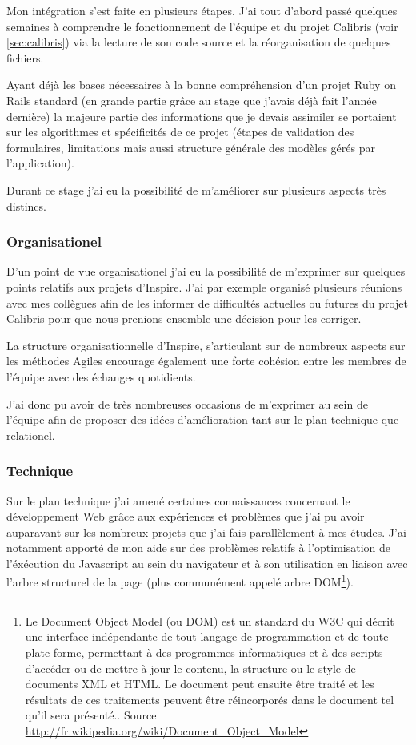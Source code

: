 \documentclass[12pt,a4paper]{book}
\begin{document}
Mon intégration s'est faite en plusieurs étapes. J'ai tout d'abord passé quelques semaines à comprendre le fonctionnement de l'équipe et du projet Calibris (voir \cref{sec:calibris}) via la lecture de son code source et la réorganisation de quelques fichiers.

Ayant déjà les bases nécessaires à la bonne compréhension d'un projet Ruby on Rails standard (en grande partie grâce au stage que j'avais déjà fait l'année dernière) la majeure partie des informations que je devais assimiler se portaient sur les algorithmes et spécificités de ce projet (étapes de validation des formulaires, limitations mais aussi structure générale des modèles gérés par l'application).

Durant ce stage j'ai eu la possibilité de m'améliorer sur plusieurs aspects très distincs.

\subsubsection{Organisationel}

D'un point de vue organisationel j'ai eu la possibilité de m'exprimer sur quelques points relatifs aux projets d'Inspire. J'ai par exemple organisé plusieurs réunions avec mes collègues afin de les informer de difficultés actuelles ou futures du projet Calibris pour que nous prenions ensemble une décision pour les corriger.

La structure organisationnelle d'Inspire, s'articulant sur de nombreux aspects sur les méthodes Agiles encourage également une forte cohésion entre les membres de l'équipe avec des échanges quotidients.

J'ai donc pu avoir de très nombreuses occasions de m'exprimer au sein de l'équipe afin de proposer des idées d'amélioration tant sur le plan technique que relationel.

\subsubsection{Technique}

Sur le plan technique j'ai amené certaines connaissances concernant le développement Web grâce aux expériences et problèmes que j'ai pu avoir auparavant sur les nombreux projets que j'ai fais parallèlement à mes études. J'ai notamment apporté de mon aide sur des problèmes relatifs à l'optimisation de l'éxécution du Javascript au sein du navigateur et à son utilisation en liaison avec l'arbre structurel de la page (plus communément appelé arbre DOM\footnote{Le Document Object Model (ou DOM) est un standard du W3C qui décrit une interface indépendante de tout langage de programmation et de toute plate-forme, permettant à des programmes informatiques et à des scripts d'accéder ou de mettre à jour le contenu, la structure ou le style de documents XML et HTML. Le document peut ensuite être traité et les résultats de ces traitements peuvent être réincorporés dans le document tel qu'il sera présenté.. Source \url{http://fr.wikipedia.org/wiki/Document_Object_Model}}).
\end{document}
